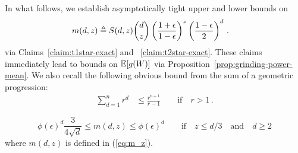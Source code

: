 
In what follows, we establish asymptotically tight upper and lower bounds on 
\begin{align}\label{eq:m_z}
m(d,z) 
&\triangleq S(d,z) {d \choose z} \left(\frac{1+\epsilon}{1-\epsilon}\right)^{z} \left(\frac{1-\epsilon}{2}\right)^{d} \, .
\end{align}
via Claims~\ref{claim:t1star-exact} and ~\ref{claim:t2star-exact}. These claims immediately lead to bounds on $\operatorname{\mathbb{E}}[ g(W) ]$ via Proposition~\ref{prop:grinding-power-mean}.
We also recall the following obvious bound from the sum of a geometric progression:
\begin{align}\label{eq:geom-series-bound}
\sum_{d=1}^n{r^d} 
&\leq \frac{r^{n+1}}{r-1} \qquad \text{if}\quad r > 1\, .
\end{align}





\begin{claim}\label{claim:t1star-exact}
\[
\phi(\epsilon)^d \frac{3}{4\sqrt{d}}
\leq 
m(d, z) 
\leq \phi(\epsilon)^d
\qquad \text{if}\quad z \leq d/3 \quad \text{and}\quad d\geq 2
\]
where $m(d, z)$ is defined in (\ref{eq:m_z}). 
\end{claim}

